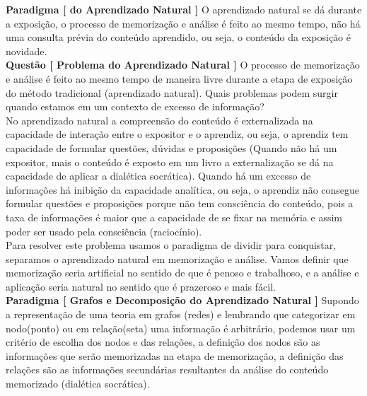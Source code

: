 \documentclass[10pt,a4paper]{report}
\begin{document}
\textbf{Paradigma [ do Aprendizado Natural ]} O aprendizado natural se dá durante a exposição, o processo de memorização e análise é feito ao mesmo tempo, não há uma consulta prévia do conteúdo aprendido, ou seja, o conteúdo da exposição é novidade.\\

\textbf{Questão [ Problema do Aprendizado Natural ]} O processo de memorização e análise é feito ao mesmo tempo de maneira livre durante a etapa de exposição do método tradicional (aprendizado natural). Quais problemas podem surgir quando estamos em um contexto de excesso de informação?\\

No aprendizado natural a compreensão do conteúdo é externalizada na capacidade de interação entre o expositor e o aprendiz, ou seja, o aprendiz tem capacidade de formular questões, dúvidas e proposições (Quando não há um expositor, mais o conteúdo é exposto em um livro a externalização se dá na capacidade de aplicar a dialética socrática). Quando há um excesso de informações há inibição da capacidade analítica, ou seja, o aprendiz não consegue formular questões e proposições porque não tem consciência do conteúdo, pois a taxa de informações é maior que a capacidade de se fixar na memória e assim poder ser usado pela consciência (raciocínio).\\

Para resolver este problema usamos o paradigma de dividir para conquistar, separamos o aprendizado natural em memorização e análise. Vamos definir que memorização seria artificial no sentido de que é penoso e trabalhoso, e a análise e aplicação seria natural no sentido que é prazeroso e mais fácil.\\

\textbf{Paradigma [ Grafos e Decomposição do Aprendizado Natural ]} Supondo a representação de uma teoria em grafos (redes) e lembrando que categorizar em nodo(ponto) ou em relação(seta) uma informação é arbitrário, podemos usar um critério de escolha dos nodos e das relações, a definição dos nodos são as informações que serão memorizadas na etapa de memorização, a definição das relações são as informações secundárias resultantes da análise do conteúdo memorizado (dialética socrática).\\
\end{document}
